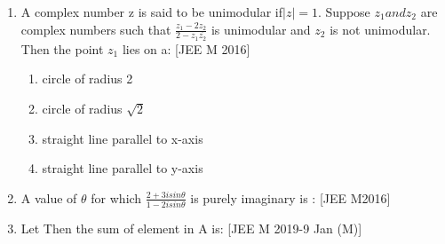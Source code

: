 \documentclass[journal,12pt,twocolumn,article]{IEEEtran}
\theoremstyle{remark}
\begin{document}
\begin{enumerate}[start = 14]
\begin{enumerate}
\end{enumerate}

\item A complex number z is said to be unimodular if$|z|=1$. Suppose $z_1 and z_2$ are complex numbers such that $\frac{z_1 -2z_2}{2-z_1\overline{z_2}}$ is unimodular and $z_2$ is not unimodular. Then the point $z_1$ lies on a:                                
\hfill{[JEE M 2016]}                               

\begin{enumerate}                                  
                              
\item circle of radius 2
                             
\item circle of radius $\sqrt2$

\item straight line parallel to x-axis

\item straight line parallel to y-axis

\end{enumerate}

\item A value of $\theta$ for which $\frac{2+3isin\theta}{1-2isin\theta}$ is purely imaginary is :      
\hfill{[JEE M2016]}

\begin{enumerate}
\end{enumerate}                                     

\item Let   Then the sum of element in A is:
\hfill{[JEE M 2019-9 Jan (M)]}
\begin{enumerate}
\end{enumerate}


\end{enumerate}
\end{document}
